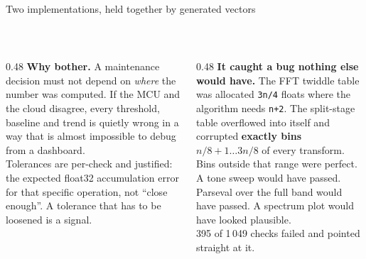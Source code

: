 \documentclass[aspectratio=169,10pt]{beamer}
\begin{document}
\begin{frame}{Two implementations, held together by generated vectors}
  \centering
  \\[3mm]
  \begin{columns}[T]
    \begin{column}{0.48\textwidth}
      \scriptsize
      \textbf{Why bother.} A maintenance decision must not depend on
      \emph{where} the number was computed. If the MCU and the cloud disagree,
      every threshold, baseline and trend is quietly wrong in a way that is
      almost impossible to debug from a dashboard.
      \\[2mm]
      Tolerances are per-check and justified: the expected float32 accumulation
      error for that specific operation, not ``close enough''. A tolerance that
      has to be loosened is a signal.
    \end{column}
    \begin{column}{0.48\textwidth}
      \scriptsize
      \textbf{It caught a bug nothing else would have.} The FFT twiddle table
      was allocated \texttt{3n/4} floats where the algorithm needs
      \texttt{n+2}. The split-stage table overflowed into itself and corrupted
      \textbf{exactly bins $n/8+1 \ldots 3n/8$} of every transform.
      \\[1.5mm]
      Bins outside that range were perfect. A tone sweep would have passed.
      Parseval over the full band would have passed. A spectrum plot would have
      looked plausible.
      \\[1.5mm]
      395 of 1\,049 checks failed and pointed straight at it.
    \end{column}
  \end{columns}
\end{frame}
\end{document}
